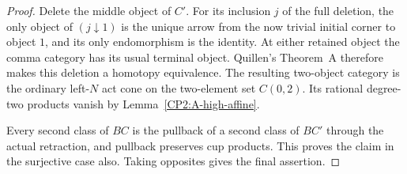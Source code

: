 \begin{proof}
Delete the middle object of $C'$.  For its inclusion $j$ of the
full deletion, the only object of $(j\downarrow1)$ is the unique
arrow from the now trivial initial corner to object $1$, and its
only endomorphism is the identity.  At either retained object the
comma category has its usual terminal object.  Quillen's
Theorem~A therefore makes this deletion a homotopy equivalence.
The resulting two-object category is the ordinary left-$N$ act
cone on the two-element set $C(0,2)$.  Its rational degree-two
products vanish by Lemma~\ref{CP2:A-high-affine}.

Every second class of $BC$ is the pullback of a second class of
$BC'$ through the actual retraction, and pullback preserves cup
products.  This proves the claim in the surjective case also.
Taking opposites gives the final assertion.
\end{proof}
